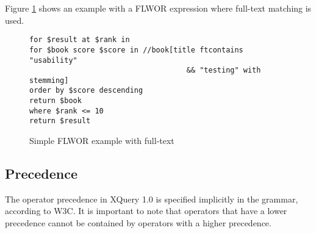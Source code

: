 Figure \ref{code:theory:flwor_fulltext} shows an example with a FLWOR expression
where full-text matching is used.

\begin{figure}
\begin{Verbatim}
for $result at $rank in
for $book score $score in //book[title ftcontains "usability" 
                                    && "testing" with stemming]
order by $score descending
return $book
where $rank <= 10
return $result
\end{Verbatim}
\caption[Simple FLWOR full-text example]{Simple FLWOR example with full-text}
\label{code:theory:flwor_fulltext}
\end{figure}

\subsection{Precedence}
\label{sect:xquery:precedence}
The operator precedence in XQuery 1.0 is specified implicitly in the grammar,
according to W3C\cite{w3cprecedence}. It is important to note that operators that 
have a lower precedence cannot be contained by operators with a higher 
precedence.
